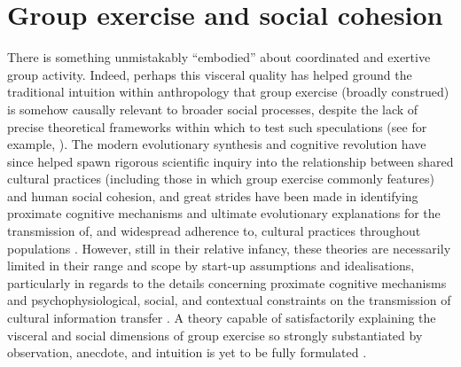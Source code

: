 \section{Group exercise and social cohesion}
\begin{mccorrection}
  There is something unmistakably ``embodied'' about coordinated and exertive group activity. Indeed, perhaps this visceral quality has helped ground the traditional intuition within anthropology that group exercise (broadly construed) is somehow causally relevant to broader social processes, despite the lack of precise theoretical frameworks within which to test such speculations (see for example, \citep{Durkheim1965,Mauss1935,Radcliffe-Brown1952,Turner1974,Merleau-Ponty1956,Bourdieu1990}).  The modern evolutionary synthesis and cognitive revolution have since helped spawn rigorous scientific inquiry into the relationship between shared cultural practices (including those in which group exercise commonly features) and human social cohesion, and great strides have been made in identifying proximate cognitive mechanisms and ultimate evolutionary explanations for the transmission of,
  and widespread adherence to, cultural practices throughout populations \citep{Dawkins1976,Boyd1988,Sperber1996,Barrett2002,Whitehouse2004,Whitehouse2014,Henrich2007}.
  However, still in their relative infancy, these theories are necessarily limited in their range and scope by start-up assumptions and idealisations, particularly in regards to the details concerning proximate cognitive mechanisms and psychophysiological, social, and contextual constraints on the transmission of cultural information transfer \citep{Sperber1996,Dunbar2012,Claidiere2014}. A theory capable of satisfactorily explaining the visceral and social dimensions of group exercise so strongly substantiated by observation, anecdote, and intuition is yet to be fully formulated \citep{Cohen2017}.

\end{mccorrection}

